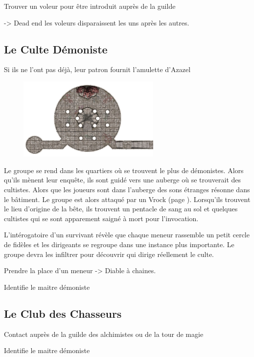 Trouver un voleur pour être introduit auprès de la guilde

-> Dead end les voleurs disparaissent les uns après les autres.

\subsection*{Le Culte Démoniste}

Si ils ne l'ont pas déjà, leur patron fournit l'amulette d'Azazel

\begin{figure}[htb!]
\center
\includegraphics[width=7cm]{Maps/Temple.png}
\end{figure}

Le groupe se rend dans les quartiers où se trouvent le plus de démonistes. 
Alors qu'ils mènent leur enquête, ils sont guidé vers une auberge où se 
trouverait des cultistes. Alors que les joueurs sont dans l'auberge des sons 
étranges résonne dans le bâtiment. Le groupe est alors attaqué par un Vrock
(page \pageref{Vrock}). Lorsqu'ils trouvent le lieu d'origine de la bête, ils trouvent un 
pentacle de sang au sol et quelques cultistes qui se sont apparement saigné 
à mort pour l'invocation.

L'intérogatoire d'un survivant révèle que chaque meneur rassemble un petit 
cercle de fidèles et les dirigeants se regroupe dans une instance plus 
importante. Le groupe devra les infiltrer pour découvrir qui dirige réellement
le culte.

Prendre la place d'un meneur -> Diable à chaines.


Identifie le maitre démoniste

\subsection*{Le Club des Chasseurs}

Contact auprès de la guilde des alchimistes ou de la tour de magie


Identifie le maitre démoniste
